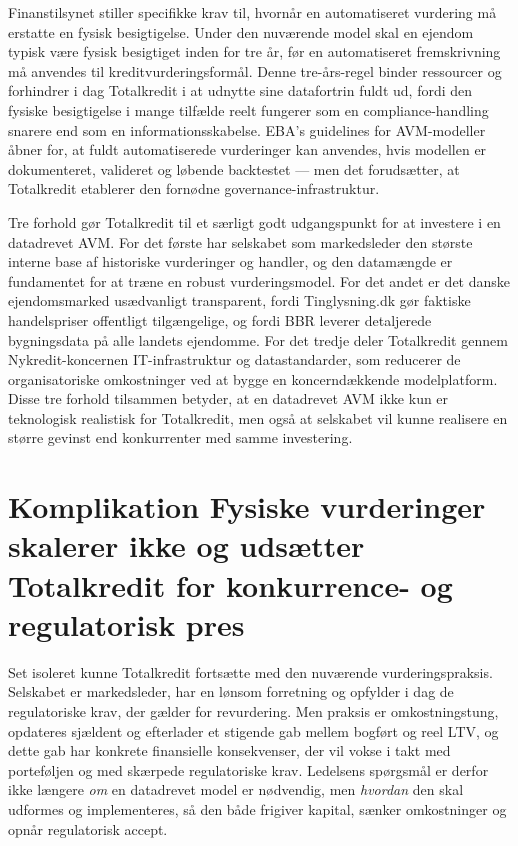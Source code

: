 \documentclass[12pt]{article}
\begin{document}
Finanstilsynet stiller specifikke krav til, hvornår en automatiseret vurdering må erstatte en fysisk besigtigelse. Under den nuværende model skal en ejendom typisk være fysisk besigtiget inden for tre år, før en automatiseret fremskrivning må anvendes til kreditvurderingsformål. Denne tre-års-regel binder ressourcer og forhindrer i dag Totalkredit i at udnytte sine datafortrin fuldt ud, fordi den fysiske besigtigelse i mange tilfælde reelt fungerer som en compliance-handling snarere end som en informationsskabelse. EBA's guidelines for AVM-modeller åbner for, at fuldt automatiserede vurderinger kan anvendes, hvis modellen er dokumenteret, valideret og løbende backtestet --- men det forudsætter, at Totalkredit etablerer den fornødne governance-infrastruktur.

Tre forhold gør Totalkredit til et særligt godt udgangspunkt for at investere i en datadrevet AVM. For det første har selskabet som markedsleder den største interne base af historiske vurderinger og handler, og den datamængde er fundamentet for at træne en robust vurderingsmodel. For det andet er det danske ejendomsmarked usædvanligt transparent, fordi Tinglysning.dk gør faktiske handelspriser offentligt tilgængelige, og fordi BBR leverer detaljerede bygningsdata på alle landets ejendomme. For det tredje deler Totalkredit gennem Nykredit-koncernen IT-infrastruktur og datastandarder, som reducerer de organisatoriske omkostninger ved at bygge en koncerndækkende modelplatform. Disse tre forhold tilsammen betyder, at en datadrevet AVM ikke kun er teknologisk realistisk for Totalkredit, men også at selskabet vil kunne realisere en større gevinst end konkurrenter med samme investering.

\newpage

\section{Komplikation \textbar{} Fysiske vurderinger skalerer ikke og udsætter Totalkredit for konkurrence- og regulatorisk pres}
\label{sec:komplikation}
Set isoleret kunne Totalkredit fortsætte med den nuværende vurderingspraksis. Selskabet er markedsleder, har en lønsom forretning og opfylder i dag de regulatoriske krav, der gælder for revurdering. Men praksis er omkostningstung, opdateres sjældent og efterlader et stigende gab mellem bogført og reel LTV, og dette gab har konkrete finansielle konsekvenser, der vil vokse i takt med porteføljen og med skærpede regulatoriske krav. Ledelsens spørgsmål er derfor ikke længere \textit{om} en datadrevet model er nødvendig, men \textit{hvordan} den skal udformes og implementeres, så den både frigiver kapital, sænker omkostninger og opnår regulatorisk accept.
\end{document}
